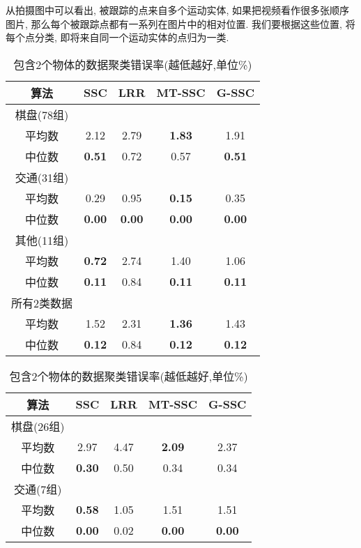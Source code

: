 从拍摄图中可以看出, 被跟踪的点来自多个运动实体, 如果把视频看作很多张顺序
图片, 那么每个被跟踪点都有一系列在图片中的相对位置. 我们要根据这些位置,
将每个点分类, 即将来自同一个运动实体的点归为一类.
\begin{table}[!htb]
  \centering
  \begin{tabular}{|c|c|c|c|c|}
	\hline
	算法 & SSC  & LRR  & MT-SSC        & G-SSC         \\ \hline \hline 
	棋盘(78组) &      &      &               &               \\
	平均数     & 2.12 & 2.79 & \textbf{1.83} & 1.91 \\
    中位数     & \textbf{0.51} & 0.72 & 0.57   &\textbf{0.51}  \\ \hline
	交通(31组) &      &      &               &               \\
	平均数     & 0.29 & 0.95 & \textbf{0.15} & 0.35          \\
    中位数     & \textbf{0.00} & \textbf{0.00} & \textbf{0.00}& \textbf{0.00} \\ \hline
	其他(11组) &      &      &               &               \\
    平均数     & \textbf{0.72} & 2.74 & 1.40          & 1.06          \\
    中位数     & \textbf{0.11} & 0.84 &\textbf{0.11} & \textbf{0.11}   \\ \hline
	所有2类数据  &      &      &               &               \\
	平均数     & 1.52 & 2.31 & \textbf{1.36} & 1.43 \\
    中位数     & \textbf{0.12} & 0.84 & \textbf{0.12} & \textbf{0.12}  \\ \hline
  \end{tabular}
  \caption{包含2个物体的数据聚类错误率(越低越好,单位\%)}
  \label{tab:hopkins2}
  \bigskip
  \begin{tabular}{|c|c|c|c|c|}
	\hline
	算法 & SSC  & LRR  & MT-SSC        & G-SSC         \\ \hline \hline
	棋盘(26组) &      &      &               &               \\
	平均数     & 2.97 & 4.47 & \textbf{2.09} & 2.37 \\
    中位数     & \textbf{0.30} & 0.50 & 0.34 & 0.34          \\ \hline
	交通(7组)  &      &      &               &               \\
    平均数     & \textbf{0.58} & 1.05 & 1.51          & 1.51          \\
    中位数     & \textbf{0.00} & 0.02 & \textbf{0.00}& \textbf{0.00}  \\ \hline

\end{tabular}
\end{table}
